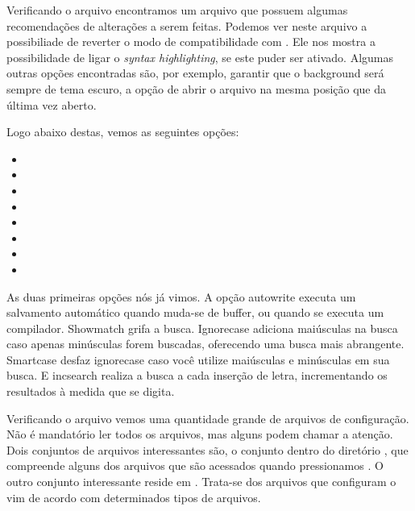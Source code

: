 
Verificando o arquivo  encontramos um arquivo que possuem algumas
recomendações de alterações a serem feitas.
Podemos ver neste arquivo a possibiliade de reverter o modo de compatibilidade com .
Ele nos mostra a possibilidade de ligar o \emph{syntax highlighting}, se este puder ser ativado.
Algumas outras opções encontradas são, por exemplo, garantir que o background será sempre de tema escuro,
a opção de abrir o arquivo na mesma posição que da última vez aberto.


Logo abaixo destas, vemos as seguintes opções:
\begin{multicols}{3}
\begin{itemize}
	\item {}
	\item {}
	\item {}
	\item {}
	\item {}
	\item {}
	\item {}
	\item {}
\end{itemize}
\end{multicols}


As duas primeiras opções nós já vimos.
A opção autowrite executa um salvamento automático quando muda-se de buffer,
ou quando se executa um compilador.
Showmatch grifa a busca.
Ignorecase adiciona maiúsculas na busca caso apenas minúsculas forem buscadas,
oferecendo uma busca mais abrangente.
Smartcase desfaz ignorecase caso você utilize maiúsculas e minúsculas em sua busca.
E incsearch realiza a busca a cada inserção de letra, incrementando os resultados à medida que se digita.

Verificando o arquivo  vemos uma quantidade grande de arquivos de configuração.
Não é mandatório ler todos os arquivos, mas alguns podem chamar a atenção.
Dois conjuntos de arquivos interessantes são, o conjunto dentro do diretório , que compreende
alguns dos arquivos que são acessados quando pressionamos .
O outro conjunto interessante reside em .
Trata-se dos arquivos que configuram o vim de acordo com determinados tipos de arquivos.

